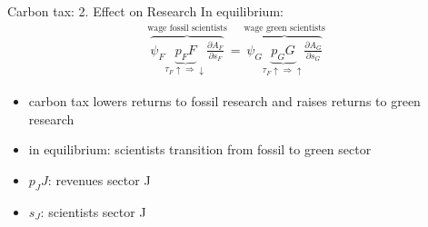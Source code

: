 \documentclass[11pt,aspectratio=169]{beamer}
\begin{document}
	\begin{frame}{Carbon tax: 2. Effect on Research}
	\vspace{-7mm}
	In equilibrium: \large
	\begin{align*}
		\overbrace{{\psi_F} \underbrace{p_F{F}}_{\tau_F\uparrow\Rightarrow\downarrow}\frac{\partial A_{F}}{\partial s_{F}}}^{\text{wage fossil scientists}}=\overbrace{{\psi_G} \underbrace{p_G{G}}_{\tau_F\uparrow\Rightarrow\uparrow}\frac{\partial A_{G}}{\partial s_{G}}}^{\text{wage green scientists}}
	\end{align*}
	\normalsize
	\begin{itemize}
		\item carbon tax lowers returns to fossil research and raises returns to green research
		\item in equilibrium: scientists transition from fossil to green sector
	\end{itemize}
	\small
	\vspace{0mm}
	\hspace{-4mm}
	\begin{minipage}[t!]{0.3\textwidth}
		\vspace{0mm}
		\begin{itemize}
			\item[] $p_JJ$: revenues sector J
		\end{itemize}
	\end{minipage}
	\vspace{-5mm}
	\begin{minipage}[t!]{0.5\textwidth}
		\vspace{0mm}
		\begin{itemize}	
			\item[] $s_J$: scientists sector J
		\end{itemize}
	\end{minipage}
\end{frame}
\end{document}
